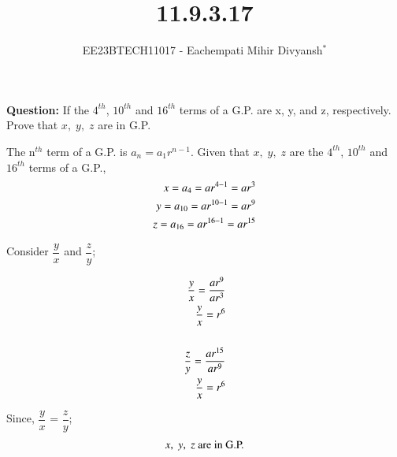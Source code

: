 \documentclass[journal,12pt,twocolumn]{IEEEtran}
\theoremstyle{remark}
\begin{document}

\vspace{3cm}

\title{11.9.3.17}
\author{EE23BTECH11017 - Eachempati Mihir Divyansh$^{*}$%
}
\maketitle
\newpage
\bigskip

\renewcommand{\thefigure}{\theenumi}
\renewcommand{\thetable}{\theenumi}

\textbf{Question: }
If the $4^{th}$, $10^{th}$ and $16^{th}$ terms of a G.P. are x, y, and z, respectively. Prove that $x,\; y,\; z$ are in G.P.\\
\solution

The n$^{th}$ term of a G.P. is $a_n=a_1r^{n-1}$. Given that $x,\; y,\; z$ are the $4^{th}$, $10^{th}$ and $16^{th}$ terms of a G.P.,
\begin{align}
\notag    x = a_4 =ar^{4-1}=ar^3 \\
\notag     y=a_{10}=ar^{10-1}=ar^9 \\
\notag     z=a_{16}=ar^{16-1}=ar^{15}
\end{align}

Consider $\dfrac{y}{x}$ and $\dfrac{z}{y}$;

\begin{align}
    \dfrac{y}{x} = \dfrac{ar^9}{ar^3} \\
    \dfrac{y}{x} = r^6\\ \notag\\
    \dfrac{z}{y} = \dfrac{ar^{15}}{ar^9} \\ 
    \dfrac{y}{x} = r^6
\end{align}

Since, $\dfrac{y}{x}$ = $\dfrac{z}{y}$;\\
\begin{align}  
\notag    x,\; y,\; z \text{ are in G.P.}
\end{align}
\end{document}

